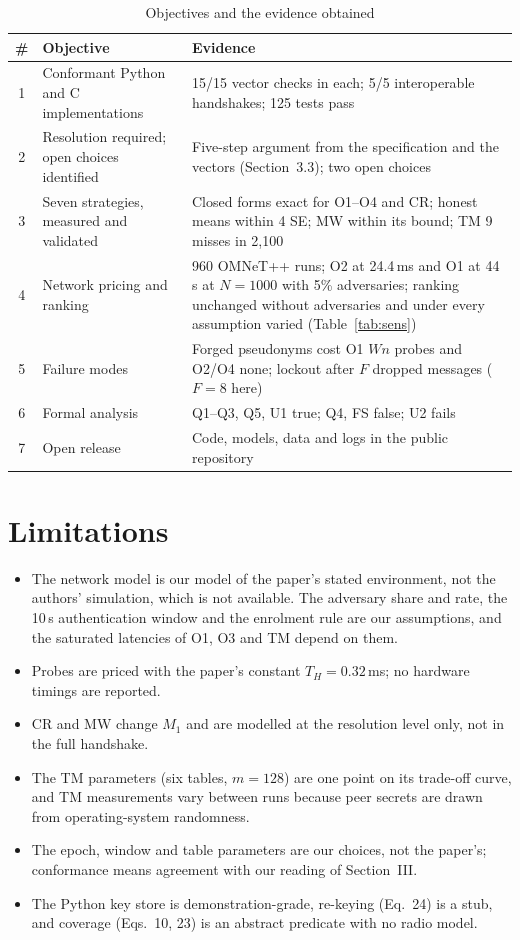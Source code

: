 \begin{table}[H]
\centering
\caption{Objectives and the evidence obtained}
\label{tab:objectives}
\small
\renewcommand{\arraystretch}{1.2}
\begin{tabularx}{\textwidth}{|c|>{\raggedright\arraybackslash}p{}|X|}
\hline
\textbf{\#} & \textbf{Objective} & \textbf{Evidence}\\ \hline
1 & Conformant Python and C implementations & 15/15 vector checks in each; 5/5 interoperable handshakes; 125 tests pass\\ \hline
2 & Resolution required; open choices identified & Five-step argument from the specification and the vectors (Section~3.3); two open choices\\ \hline
3 & Seven strategies, measured and validated & Closed forms exact for O1--O4 and CR; honest means within 4 SE; MW within its bound; TM 9 misses in 2,100\\ \hline
4 & Network pricing and ranking & 960 OMNeT++ runs; O2 at 24.4\,ms and O1 at 44\,s at $N=1000$ with 5\% adversaries; ranking unchanged without adversaries and under every assumption varied (Table~\ref{tab:sens})\\ \hline
5 & Failure modes & Forged pseudonyms cost O1 $Wn$ probes and O2/O4 none; lockout after $F$ dropped messages ($F=8$ here)\\ \hline
6 & Formal analysis & Q1--Q3, Q5, U1 true; Q4, FS false; U2 fails\\ \hline
7 & Open release & Code, models, data and logs in the public repository\\ \hline
\end{tabularx}
\end{table}

\section{Limitations}
\begin{itemize}
\item The network model is our model of the paper's stated environment, not the authors' simulation, which is not available. The adversary share and rate, the 10\,s authentication window and the enrolment rule are our assumptions, and the saturated latencies of O1, O3 and TM depend on them.
\item Probes are priced with the paper's constant $T_H=0.32$\,ms; no hardware timings are reported.
\item CR and MW change $M_1$ and are modelled at the resolution level only, not in the full handshake.
\item The TM parameters (six tables, $m=128$) are one point on its trade-off curve, and TM measurements vary between runs because peer secrets are drawn from operating-system randomness.
\item The epoch, window and table parameters are our choices, not the paper's; conformance means agreement with our reading of Section~III.
\item The Python key store is demonstration-grade, re-keying (Eq.~24) is a stub, and coverage (Eqs.~10, 23) is an abstract predicate with no radio model.
\end{itemize}

